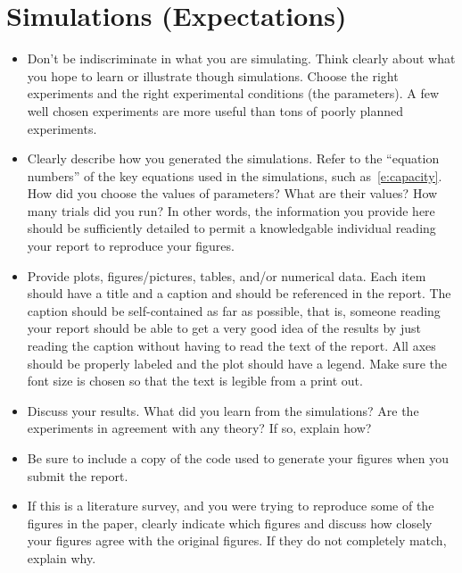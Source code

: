 \documentclass[article,11pt,onecolumn,final]{IEEEtran}
\begin{document}
\section{Simulations (Expectations)} 

\begin{itemize}
\item Don't be indiscriminate in what
you are simulating. Think clearly about what you hope to learn or
illustrate though simulations. Choose the right experiments and the
right experimental conditions (the parameters). A few well chosen experiments
are more useful than tons of poorly planned experiments.

\item Clearly describe how you generated the simulations. Refer to the ``equation numbers'' of the key equations used in the simulations, such as~\eqref{e:capacity}.
 How did you choose
the values of parameters? What are their values? How many
trials did you run? In other words, the information you
provide here should be sufficiently detailed to permit a knowledgable
individual reading your report to reproduce your figures.

\item Provide plots, figures/pictures,
tables, and/or numerical data. Each item should have a title and a
caption and should be referenced in the report. The caption should be
self-contained as far as possible, that is, someone reading your
report should be able to get a very good idea of the results by just
reading the caption without having to read the text of the
report. All axes should be properly
labeled and the plot should have a legend. Make sure the font size is chosen so that the 
text is legible from a print out.

\item Discuss your results. What did you learn from the
simulations? Are the experiments in agreement with any theory? If so,
explain how? 

\item Be sure to include a copy of the code used to generate your figures when you submit the report.

\item If this is a literature survey, and you were trying to reproduce some of the figures in the paper, clearly indicate which figures and discuss how closely your figures agree with the original figures. If they do not completely match, explain why.

\end{itemize}
\end{document}
